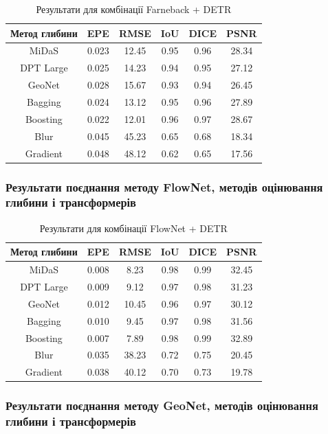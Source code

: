 \documentclass[14pt, a4paper]{extarticle}
\numberwithin{equation}{section}
\begin{document}
\begin{table}[H]
\centering
\caption{Результати для комбінації Farneback + DETR}
\begin{tabular}{|c|c|c|c|c|c|}
\hline
\textbf{Метод глибини} & \textbf{EPE} & \textbf{RMSE} & \textbf{IoU} & \textbf{DICE} & \textbf{PSNR} \\
\hline
MiDaS & 0.023 & 12.45 & 0.95 & 0.96 & 28.34 \\
DPT Large & 0.025 & 14.23 & 0.94 & 0.95 & 27.12 \\
GeoNet & 0.028 & 15.67 & 0.93 & 0.94 & 26.45 \\
Bagging & 0.024 & 13.12 & 0.95 & 0.96 & 27.89 \\
Boosting & 0.022 & 12.01 & 0.96 & 0.97 & 28.67 \\
Blur & 0.045 & 45.23 & 0.65 & 0.68 & 18.34 \\
Gradient & 0.048 & 48.12 & 0.62 & 0.65 & 17.56 \\
\hline
\end{tabular}
\label{tab:farneback}
\end{table}

\subsubsection{Результати поєднання методу FlowNet, методів оцінювання глибини і трансформерів}

\begin{table}[H]
\centering
\caption{Результати для комбінації FlowNet + DETR}
\begin{tabular}{|c|c|c|c|c|c|}
\hline
\textbf{Метод глибини} & \textbf{EPE} & \textbf{RMSE} & \textbf{IoU} & \textbf{DICE} & \textbf{PSNR} \\
\hline
MiDaS & 0.008 & 8.23 & 0.98 & 0.99 & 32.45 \\
DPT Large & 0.009 & 9.12 & 0.97 & 0.98 & 31.23 \\
GeoNet & 0.012 & 10.45 & 0.96 & 0.97 & 30.12 \\
Bagging & 0.010 & 9.45 & 0.97 & 0.98 & 31.56 \\
Boosting & 0.007 & 7.89 & 0.98 & 0.99 & 32.89 \\
Blur & 0.035 & 38.23 & 0.72 & 0.75 & 20.45 \\
Gradient & 0.038 & 40.12 & 0.70 & 0.73 & 19.78 \\
\hline
\end{tabular}
\label{tab:flownet}
\end{table}

\subsubsection{Результати поєднання методу GeoNet, методів оцінювання глибини і трансформерів}
\end{document}
